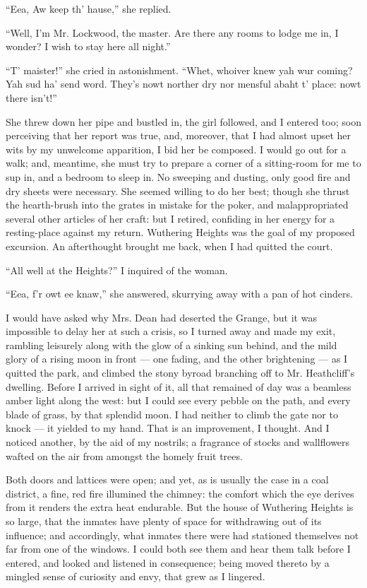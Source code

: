 \par “Eea, Aw keep th' hause,” she replied.
\par “Well, I'm Mr. Lockwood, the master. Are there any rooms to lodge me in, I wonder? I wish to stay here all night.”
\par “T' maister!” she cried in astonishment. “Whet, whoiver knew yah wur coming? Yah sud ha' send word. They's nowt norther dry nor mensful abaht t' place: nowt there isn't!”
\par She threw down her pipe and bustled in, the girl followed, and I entered too; soon perceiving that her report was true, and, moreover, that I had almost upset her wits by my unwelcome apparition, I bid her be composed. I would go out for a walk; and, meantime, she must try to prepare a corner of a sitting-room for me to sup in, and a bedroom to sleep in. No sweeping and dusting, only good fire and dry sheets were necessary. She seemed willing to do her best; though she thrust the hearth-brush into the grates in mistake for the poker, and malappropriated several other articles of her craft: but I retired, confiding in her energy for a resting-place against my return. Wuthering Heights was the goal of my proposed excursion. An afterthought brought me back, when I had quitted the court.
\par “All well at the Heights?” I inquired of the woman.
\par “Eea, f'r owt ee knaw,” she answered, skurrying away with a pan of hot cinders.
\par I would have asked why Mrs. Dean had deserted the Grange, but it was impossible to delay her at such a crisis, so I turned away and made my exit, rambling leisurely along with the glow of a sinking sun behind, and the mild glory of a rising moon in front — one fading, and the other brightening — as I quitted the park, and climbed the stony byroad branching off to Mr. Heathcliff's dwelling. Before I arrived in sight of it, all that remained of day was a beamless amber light along the west: but I could see every pebble on the path, and every blade of grass, by that splendid moon. I had neither to climb the gate nor to knock — it yielded to my hand. That is an improvement, I thought. And I noticed another, by the aid of my nostrils; a fragrance of stocks and wallflowers wafted on the air from amongst the homely fruit trees.
\par Both doors and lattices were open; and yet, as is usually the case in a coal district, a fine, red fire illumined the chimney: the comfort which the eye derives from it renders the extra heat endurable. But the house of Wuthering Heights is so large, that the inmates have plenty of space for withdrawing out of its influence; and accordingly, what inmates there were had stationed themselves not far from one of the windows. I could both see them and hear them talk before I entered, and looked and listened in consequence; being moved thereto by a mingled sense of curiosity and envy, that grew as I lingered.
